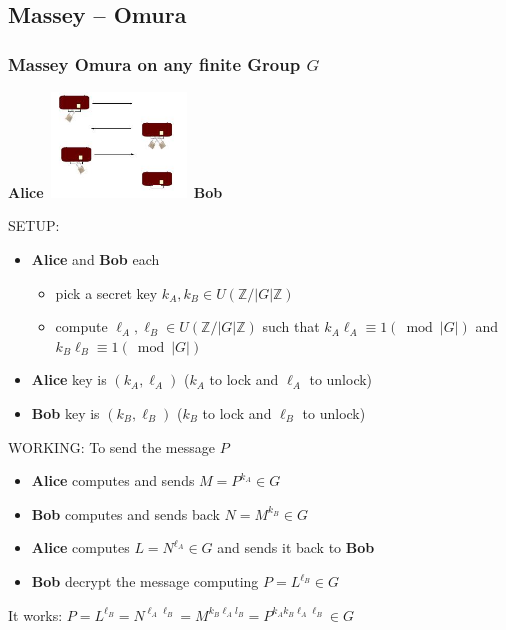 \documentclass[10pt,handout]{beamer} %
\newcommand{\Z}{\mathbb Z}
\theoremstyle{definition}
\begin{document}
\subsection{Massey -- Omura}
\begin{frame}
\frametitle{Massey Omura on any finite Group $G$}\pause

\centerline{\textbf{Alice}\ \includegraphics[width=3.6cm]{images/MasseyOmura.jpg}\ \textbf{Bob}}\pause

\begin{beamerboxesrounded}[upper=block title example,lower=block body alerted,shadow=true]{SETUP:}
\begin{itemize}
\item[\textcolor{red}{\ding{172}}]
\textbf{Alice} and \textbf{Bob} each 
\begin{itemize}
\item pick a secret key $k_A,k_B\in U(\Z/|G|\Z)$
\item compute $\ell_A,\ell_B\in U(\Z/|G|\Z)$ such that
$k_A\ell_A\equiv 1(\bmod |G|)$ and $k_B\ell_B\equiv1(\bmod |G|)$
\end{itemize}
\item[\textcolor{red}{\ding{175}}]
{\textbf{Alice} key is $(k_A,\ell_A)$ ($k_A$ to lock and $\ell_A$ to unlock)}
\item[\textcolor{red}{\ding{176}}]
{\textbf{Bob} key is $(k_B,\ell_B)$ ($k_B$ to lock and $\ell_B$ to unlock)}
\end{itemize} 
\end{beamerboxesrounded}


\begin{beamerboxesrounded}[upper=block title example,lower=block body alerted,shadow=true]{WORKING: To send the message $P$} 
\begin{itemize}
\item[\textcolor{blue}{\ding{172}}] {\textbf{Alice} computes and sends
$M=P^{k_A}\in G$}
\item[\textcolor{blue}{\ding{173}}] {\textbf{Bob} computes and sends back $N=M^{k_B}\in G$}
\item[\textcolor{blue}{\ding{174}}] {\textbf{Alice} computes $L=N^{\ell_A}\in G$ and sends
it back to \textbf{Bob}}
\item[\textcolor{blue}{\ding{175}}] {\textbf{Bob} decrypt the message computing $P=L^{\ell_B}\in G$}
\end{itemize}\pause
\end{beamerboxesrounded}

It works: $P=L^{\ell_B}=N^{\ell_A\ell_B}=M^{k_B\ell_Al_B}=P^{{k_Ak_B\ell_A\ell_B}}\in G$
\end{frame}
\end{document}
